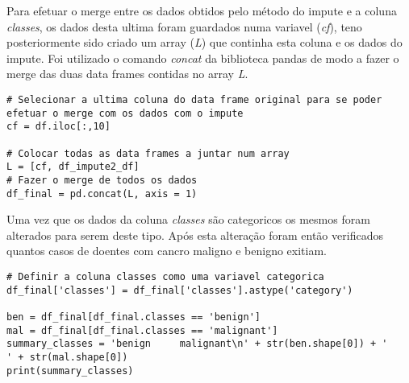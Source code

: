 \documentclass{article}
\begin{document}
Para efetuar o merge entre os dados obtidos pelo m\'etodo do impute e a coluna \textit{classes}, os dados desta ultima foram guardados numa variavel (\textit{cf}), teno posteriormente sido criado um array (\textit{L}) que continha esta coluna e os dados do impute.
Foi utilizado o comando \textit{concat} da biblioteca pandas de modo a fazer o merge das duas data frames contidas no array \textit{L}.

\begin{lstlisting}
# Selecionar a ultima coluna do data frame original para se poder efetuar o merge com os dados com o impute
cf = df.iloc[:,10]

# Colocar todas as data frames a juntar num array
L = [cf, df_impute2_df]
# Fazer o merge de todos os dados
df_final = pd.concat(L, axis = 1)
\end{lstlisting}

Uma vez que os dados da coluna \textit{classes} s\~ao categoricos os mesmos foram alterados para serem deste tipo. Ap\'os esta altera\c c\~ao foram ent\~ao verificados quantos casos de doentes com cancro maligno e benigno exitiam.

\begin{lstlisting}
# Definir a coluna classes como uma variavel categorica
df_final['classes'] = df_final['classes'].astype('category')

ben = df_final[df_final.classes == 'benign']
mal = df_final[df_final.classes == 'malignant']
summary_classes = 'benign     malignant\n' + str(ben.shape[0]) + '        ' + str(mal.shape[0])
print(summary_classes)
\end{lstlisting}
\end{document}
